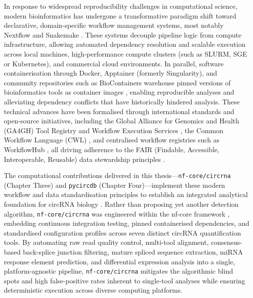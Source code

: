 In response to widespread reproducibility challenges in computational science, modern bioinformatics has undergone a transformative paradigm shift toward declarative, domain-specific workflow management systems, most notably Nextflow \cite{DiTommaso2017} and Snakemake \cite{Koster2012Oct, Molder2021Feb}. These systems decouple pipeline logic from compute infrastructure, allowing automated dependency resolution and scalable execution across local machines, high-performance compute clusters (such as SLURM, SGE or Kubernetes), and commercial cloud environments. In parallel, software containerisation through Docker, Apptainer (formerly Singularity), and community repositories such as BioContainers warehouse pinned versions of bioinformatics tools as container images \cite{Docker, Apptainer, daVeigaLeprevost2017Aug}, enabling reproducible analyses and alleviating dependency conflicts that have historically hindered analysis. These technical advances have been formalised through international standards and open-source initiatives, including the Global Alliance for Genomics and Health (GA4GH) Tool Registry and Workflow Execution Services \cite{Rehm2021Nov}, the Common Workflow Language (CWL) \cite{Crusoe2022Jun}, and centralised workflow registries such as WorkflowHub \cite{Goble2021Oct}, all driving adherence to the FAIR (Findable, Accessible, Interoperable, Reusable) data stewardship principles \cite{Wilkinson2016Mar}.

The computational contributions delivered in this thesis—\texttt{nf-core/circrna} (Chapter Three) and \texttt{pycircdb} (Chapter Four)—implement these modern workflow and data standardisation principles to establish an integrated analytical foundation for circRNA biology \cite{Digby2023Dec, Digby2024Dec}. Rather than proposing yet another detection algorithm, \texttt{nf-core/circrna} was engineered within the nf-core framework \cite{Ewels2020Mar}, embedding continuous integration testing, pinned containerised dependencies, and standardised configuration profiles across seven distinct circRNA quantification tools. By automating raw read quality control, multi-tool alignment, consensus-based back-splice junction filtering, mature spliced sequence extraction, miRNA response element prediction, and differential expression analysis into a single, platform-agnostic pipeline, \texttt{nf-core/circrna} mitigates the algorithmic blind spots and high false-positive rates inherent to single-tool analyses while ensuring deterministic execution across diverse computing platforms.

